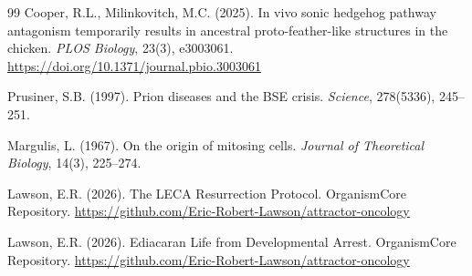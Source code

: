\documentclass[11pt]{article}
\theoremstyle{definition}
\begin{document}
\begin{thebibliography}{99}
Cooper, R.L., Milinkovitch, M.C. (2025).
In vivo sonic hedgehog pathway antagonism temporarily
results in ancestral proto-feather-like structures in
the chicken.
\textit{PLOS Biology}, 23(3), e3003061.
\url{https://doi.org/10.1371/journal.pbio.3003061}

Prusiner, S.B. (1997).
Prion diseases and the BSE crisis.
\textit{Science}, 278(5336), 245--251.

Margulis, L. (1967).
On the origin of mitosing cells.
\textit{Journal of Theoretical Biology}, 14(3), 225--274.

Lawson, E.R. (2026).
The LECA Resurrection Protocol.
OrganismCore Repository.
\url{https://github.com/Eric-Robert-Lawson/attractor-oncology}

Lawson, E.R. (2026).
Ediacaran Life from Developmental Arrest.
OrganismCore Repository.
\url{https://github.com/Eric-Robert-Lawson/attractor-oncology}

\end{thebibliography}
\end{document}
